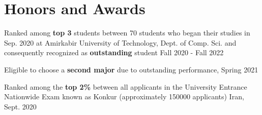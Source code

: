 
 
\section{Honors and Awards}
\begin{small}
\begin{compactitem}
        \item Ranked among \textbf{top 3} students between 70 students who began their studies in Sep. 2020 at Amirkabir University of Technology, Dept. of Comp. Sci. and consequently recognized as \textbf{outstanding} student \hfill Fall 2020 - Fall 2022
        \item Eligible to choose a \textbf{second major} due to outstanding performance, \hfill Spring 2021
        \item Ranked among the \textbf{top 2\%} between all applicants in the University Entrance Nationwide Exam known as Konkur (approximately 150000 applicants) \hfill Iran, Sept. 2020
\end{compactitem}
\end{small}

